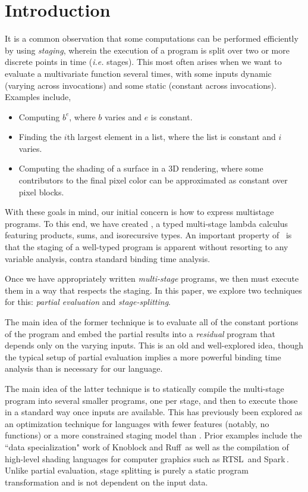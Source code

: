 \documentclass[preprint]{sigplanconf}
\begin{document}
\section{Introduction}

It is a common observation that some computations can be performed efficiently by using {\em staging}, wherein the execution of a program is split over two or more discrete points in time ({\em i.e.} stages).  This most often arises when we want to evaluate a multivariate function several times, with some inputs dynamic (varying across invocations) and some static (constant across invocations).  Examples include,
\begin{itemize}
\item Computing $b^e$, where $b$ varies and $e$ is constant.
\item Finding the $i$th largest element in a list, where the list is constant and $i$ varies.
\item Computing the shading of a surface in a 3D rendering, where some contributors to the final pixel color can be approximated as constant over  pixel blocks.  
\end{itemize}

With these goals in mind, our initial concern is how to express multistage programs. To this end, we have created \lang, a typed multi-stage lambda calculus featuring products, sums, and isorecursive types. An important property of \lang\ is that the staging of a well-typed program is apparent without resorting to any variable analysis, contra standard binding time analysis.  

Once we have appropriately written {\em multi-stage} programs, we then must execute them in a way that respects the staging.  In this paper, we explore two techniques for this: {\em partial evaluation} and {\em stage-splitting}.  

The main idea of the former technique is to evaluate all of the constant portions of the program and embed the partial results into a {\em residual} program that depends only on the varying inputs.  This is an old and well-explored idea, though the typical setup of partial evaluation implies a more powerful binding time analysis than is necessary for our language.

The main idea of the latter technique is to statically compile the multi-stage program into several smaller programs, one per stage, and then to execute those in a standard way once inputs are available.  This has previously been explored as an optimization technique for languages with fewer features (notably, no functions) or a more constrained staging model than \lang. Prior examples include the ``data specialization" work of Knoblock and Ruff\,\cite{knoblock96} as well as the compilation of high-level shading languages for computer graphics such as RTSL\,\cite{Proudfoot:2001} and Spark\,\cite{Foley:2011}.  Unlike partial evaluation, stage splitting is purely a static program transformation and is not dependent on the input data.
\end{document}

